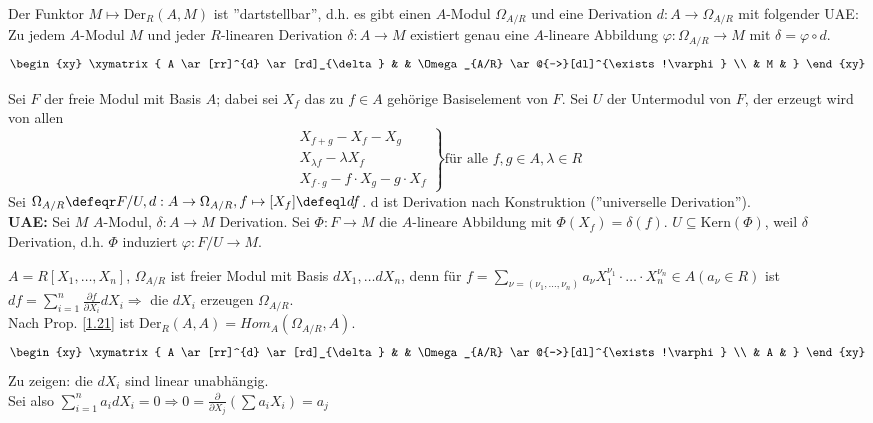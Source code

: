 \begin{PropDef}
\label{1.21}
  Der Funktor $M \mapsto \mbox{Der}_R(A,M)$ ist ''dartstellbar'', d.h. es gibt
  einen $A$-Modul $\Omega_{A/R}$ und eine Derivation $d: A \to \Omega_{A/R}$ mit
  folgender UAE:\\
  Zu jedem $A$-Modul $M$ und jeder $R$-linearen Derivation $\delta: A \to M$
  existiert genau eine $A$-lineare Abbildung $\varphi: \Omega_{A/R} \to M$ mit
  $\delta = \varphi \circ d$.
  \[
    \begin{xy}
      \xymatrix{
         A \ar[rr]^{d} \ar[rd]_{\delta}  &     &  \Omega_{A/R} \ar@{-->}[dl]^{\exists!\varphi}  \\
                                         &  M  &
      }
    \end{xy}
  \]
\end{PropDef}

\begin{Bew}
  Sei $F$ der freie Modul mit Basis $A$; dabei sei $X_f$ das zu $f \in A$
  gehörige Basiselement von $F$.
  Sei $U$ der Untermodul von $F$, der erzeugt wird von allen
  \[\left. \begin{array}{l}
       X_{f+g} - X_f - X_g\\
       X_{\lambda f} - \lambda X_f\\
       X_{f \cdot g} - f \cdot X_g - g \cdot X_f
     \end{array} \right\} \mbox{für alle } f,g \in A, \lambda \in R\]
  Sei $\Omega_{A/R} \defeqr F/U, d: A \to \Omega_{A/R}, f \mapsto [X_f] \defeql
  d f$. d ist Derivation nach Konstruktion (''universelle Derivation'').\\
  \textbf{UAE:} Sei $M$ $A$-Modul, $\delta: A \to M$ Derivation. Sei $\Phi: F \to
  M$ die $A$-lineare Abbildung mit $\Phi(X_f) = \delta(f)$. $U \subseteq
  \mbox{Kern}(\Phi)$, weil $\delta$ Derivation, d.h. $\Phi$ induziert $\varphi:
  F/U \to M$.
\end{Bew}

\begin{nnBsp}
  $A = R[X_1, \dots , X_n]$, $\Omega_{A/R}$ ist freier Modul mit Basis $d X_1,
  \dots d X_n$, denn für $f = \sum_{\nu = (\nu_1, \dots , \nu_n)} a_{\nu}
  X_1^{\nu_1} \cdot \dots \cdot X_n^{\nu_n} \in A (a_{\nu} \in R)$ ist $d f =
  \sum_{i=1}^n \frac{\partial f}{\partial X_i} d X_i \Rightarrow$ die $d X_i$
  erzeugen $\Omega_{A/R}$.\\
  Nach Prop. \ref{1.21} ist $\mbox{Der}_R(A,A) = Hom_A(\Omega_{A/R},A)$.
  \[
    \begin{xy}
      \xymatrix{
         A \ar[rr]^{d} \ar[rd]_{\delta}  &     &  \Omega_{A/R} \ar@{-->}[dl]^{\exists!\varphi}  \\
                                         &  A  &
      }
    \end{xy}
  \]
  Zu zeigen: die $dX_i$ sind linear unabhängig.\\
  Sei also $\sum_{i = 1}^n a_i d X_i = 0 \Rightarrow 0 =
  \frac{\partial}{\partial X_j}(\sum a_i X_i) = a_j$
\end{nnBsp}

